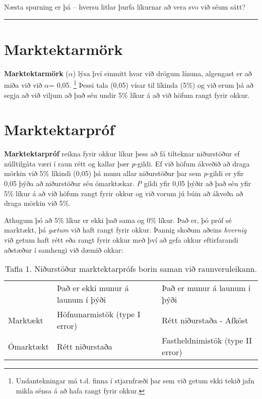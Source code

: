 \documentclass[
]{book}
\begin{document}
Næsta spurning er þá -- hversu litlar þurfa líkurnar að vera svo við séum sátt?

\begin{center}\rule{0.5\linewidth}{0.5pt}\end{center}

\hypertarget{marktektarmuxf6rk}{%
\section{Marktektarmörk}\label{marktektarmuxf6rk}}

\textbf{Marktektarmörk} (\(\alpha\)) lýsa því einmitt hvar við drögum línuna, algengast er að miða við við \(\alpha\)= 0,05. \footnote{Undantekningar má t.d. finna í stjarnfræði þar sem við getum ekki tekið jafn mikla sénsa á að hafa rangt fyrir okkur.} Þessi tala (0,05) vísar til líkinda (5\%) og við erum þá að segja að við viljum að það séu undir 5\% líkur á að við höfum rangt fyrir okkur.

\hypertarget{marktektarpruxf3f}{%
\section{Marktektarpróf}\label{marktektarpruxf3f}}

\textbf{Marktektarpróf} reikna fyrir okkur líkur þess að fá tilteknar niðurstöður ef núlltilgáta væri í raun rétt og kallar þær \emph{p}-gildi. Ef við höfum ákveðið að draga mörkin við 5\% líkindi (0,05) þá munu allar niðurstöður þar sem \emph{p}-gildi er yfir 0,05 þýða að niðurstöður séu ómarktækar. \emph{P} gildi yfir 0,05 þýðir að það séu yfir 5\% líkur á að við höfum rangt fyrir okkur og við vorum jú búin að ákveða að draga mörkin við 5\%.

Athugum þó að 5\% líkur er ekki það sama og 0\% líkur. Það er, þó próf sé marktækt, þá \emph{gætum} við haft rangt fyrir okkur. Þannig skoðum aðeins \emph{hvernig} við getum haft rétt eða rangt fyrir okkur með því að gefa okkur eftirfarandi aðstæður í samhengi við dæmið okkar:

\begin{longtable}[]{@{}
  >{\raggedright\arraybackslash}p{}
  >{\raggedright\arraybackslash}p{}
  >{\raggedright\arraybackslash}p{}@{}}
\caption{Tafla 1. Niðurstöður marktektarprófs borin saman við raunveruleikann.}\tabularnewline
\toprule()
\endhead
& Það er ekki munur á launum í þýði & Það er munur á launum í þýði \\
Marktækt & Höfnunarmistök (type I error) & Rétt niðurstaða - Afköst \\
Ómarktækt & Rétt niðurstaða & Fastheldnimistök (type II error) \\
\bottomrule()
\end{longtable}
\end{document}
